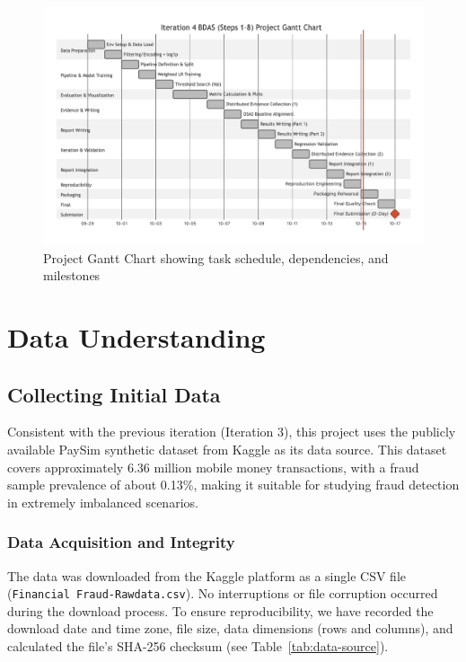 \documentclass[sigplan,screen]{acmart}
\begin{document}
\begin{figure}[h]
  \centering
  \includegraphics[width=\textwidth]{Figure/1.4.2.png}
  \caption{Project Gantt Chart showing task schedule, dependencies, and milestones}
  \label{fig:gantt-chart}
\end{figure}

\section{Data Understanding}

\subsection{Collecting Initial Data}

Consistent with the previous iteration (Iteration 3), this project uses the publicly available PaySim synthetic dataset from Kaggle as its data source. This dataset covers approximately 6.36 million mobile money transactions, with a fraud sample prevalence of about 0.13\%, making it suitable for studying fraud detection in extremely imbalanced scenarios.

\subsubsection{Data Acquisition and Integrity}

The data was downloaded from the Kaggle platform as a single CSV file (\texttt{Financial Fraud-Rawdata.csv}). No interruptions or file corruption occurred during the download process. To ensure reproducibility, we have recorded the download date and time zone, file size, data dimensions (rows and columns), and calculated the file's SHA-256 checksum (see Table~\ref{tab:data-source}).
\end{document}
